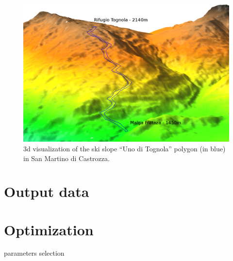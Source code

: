 \documentclass[12pt,a4paper,twoside]{book}
\begin{document}
\begin{figure}[!ht]
  \begin{center}
    \includegraphics[width=\textwidth]{images/uno_tognola_3d.eps}
    \caption{3d visualization of the ski slope ``Uno di Tognola'' polygon (in blue) in San Martino di Castrozza.}\label{uno_tognola_3d}
  \end{center}
\end{figure}

\section{Output data}

\section{Optimization}

parameters selection





\end{document}
